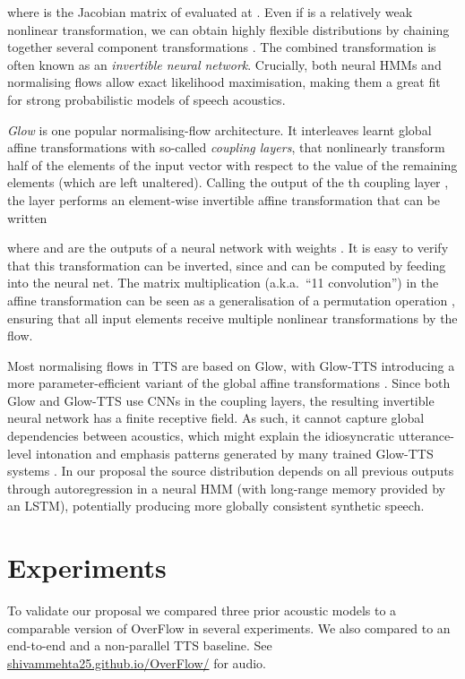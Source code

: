 \documentclass[british]{INTERSPEECH2023_arxiv}
\newcommand{\webpageurl}{https://shivammehta25.github.io/OverFlow/}
\newcommand{\webpageurltext}{shivammehta25.github.io/OverFlow/}
\begin{document}
where  is the Jacobian matrix of  evaluated at .
Even if  is a relatively weak nonlinear transformation, we can obtain highly flexible distributions by chaining together several component transformations .
The combined transformation is often known as an \emph{invertible neural network}.
Crucially, both neural HMMs and normalising flows allow exact likelihood maximisation, making them a great fit for strong probabilistic models of speech acoustics.

\emph{Glow} \cite{kingma2018glow} is one popular normalising-flow architecture.
It interleaves learnt global affine transformations with so-called \emph{coupling layers}, that nonlinearly transform half of the elements of the input vector  with respect to the value of the remaining elements (which are left unaltered).
Calling the output of the th coupling layer , the layer performs an element-wise invertible affine transformation that can be written

where  and  are the outputs of a neural network with weights .
It is easy to verify that this transformation can be inverted, since  and  can be computed by feeding  into the neural net.
The matrix multiplication (a.k.a.\ ``11 convolution'') in the affine transformation can be seen as a generalisation of a permutation operation \cite{kingma2018glow}, ensuring that all input elements receive multiple nonlinear transformations by the flow.

Most normalising flows in TTS are based on Glow, with Glow-TTS introducing a more parameter-efficient variant of the global affine transformations \cite{kim2020glow}.
Since both Glow and Glow-TTS use CNNs in
the coupling layers, the resulting invertible neural network has a finite receptive field.
As such, it cannot capture global dependencies between acoustics, which might explain the idiosyncratic utterance-level intonation and emphasis patterns generated by many trained Glow-TTS systems \cite{popov2021grad}.
In our proposal the source distribution  depends on all previous outputs  through autoregression in a neural HMM (with long-range memory provided by an LSTM),
potentially producing more globally consistent synthetic speech.


\section{Experiments}
\label{sec:experiments}

To validate our proposal we compared three prior acoustic models to a comparable version of OverFlow in several experiments.
We also compared to an end-to-end and a non-parallel TTS baseline.
See \href{\webpageurl}{\webpageurltext} for audio.
\end{document}
